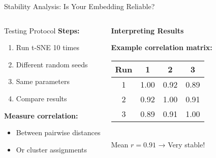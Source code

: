 \documentclass[aspectratio=169]{beamer}
\begin{document}
\begin{frame}{Stability Analysis: Is Your Embedding Reliable?}
\begin{columns}
\begin{block}{Testing Protocol}
\textbf{Steps:}
\begin{enumerate}
\item Run t-SNE 10 times
\item Different random seeds
\item Same parameters
\item Compare results
\end{enumerate}

\textbf{Measure correlation:}
\begin{itemize}
\item Between pairwise distances
\item Or cluster assignments
\end{itemize}
\end{block}

\begin{center}
\textbf{Interpreting Results}\\[3mm]

\vspace{5mm}
\textbf{Example correlation matrix:}\\
\small
\begin{tabular}{|c|c|c|c|}
\hline
Run & 1 & 2 & 3 \\
\hline
1 & 1.00 & 0.92 & 0.89 \\
2 & 0.92 & 1.00 & 0.91 \\
3 & 0.89 & 0.91 & 1.00 \\
\hline
\end{tabular}\\
\normalsize
Mean $r = 0.91$ → Very stable!
\end{center}
\end{columns}
\end{frame}
\end{document}
